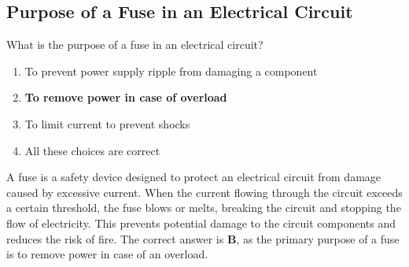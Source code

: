 \subsection{Purpose of a Fuse in an Electrical Circuit}
\label{T0A04}

\begin{tcolorbox}[colback=gray!10!white,colframe=black!75!black,title=T0A04]
What is the purpose of a fuse in an electrical circuit?
\begin{enumerate}[noitemsep]
    \item To prevent power supply ripple from damaging a component
    \item \textbf{To remove power in case of overload}
    \item To limit current to prevent shocks
    \item All these choices are correct
\end{enumerate}
\end{tcolorbox}

A fuse is a safety device designed to protect an electrical circuit from damage caused by excessive current. When the current flowing through the circuit exceeds a certain threshold, the fuse blows or melts, breaking the circuit and stopping the flow of electricity. This prevents potential damage to the circuit components and reduces the risk of fire. The correct answer is \textbf{B}, as the primary purpose of a fuse is to remove power in case of an overload.